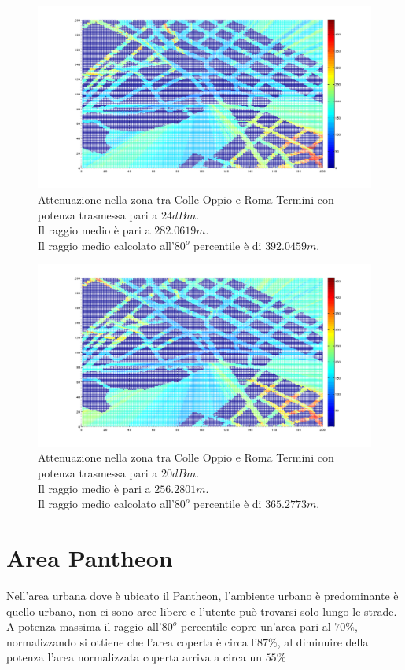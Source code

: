 \begin{figure}
\centering
\includegraphics[height=0.5\textwidth]{Immagini/ColleOppio/attenuazione_pico}
\caption{Attenuazione nella zona tra Colle Oppio e Roma Termini con potenza trasmessa pari a $24dBm$. \\
Il raggio medio è pari a $282.0619 m$.\\
Il raggio medio calcolato all'$80^o$ percentile è di $392.0459 m$.}
\label{img:attcolleoppiopico}
\end{figure}

\begin{figure}
\centering
\includegraphics[height=0.5\textwidth]{Immagini/ColleOppio/attenuazione_femto}
\caption{Attenuazione nella zona tra Colle Oppio e Roma Termini con potenza trasmessa pari a $20dBm$. \\
Il raggio medio è pari a $256.2801 m$.\\
Il raggio medio calcolato all'$80^o$ percentile è di $365.2773 m$.}
\label{img:attcolleoppiofemto}
\end{figure}

\newpage
\section{Area Pantheon}
Nell'area urbana dove è ubicato il Pantheon, l'ambiente urbano è predominante è quello urbano, non ci sono aree libere e l'utente può
trovarsi solo lungo le strade. \\
A potenza massima il raggio all'$80^o$ percentile copre un'area pari al $70\%$, normalizzando si ottiene che l'area coperta è circa 
l'$87\%$, al diminuire della potenza l'area normalizzata coperta arriva a circa un $55\%$

